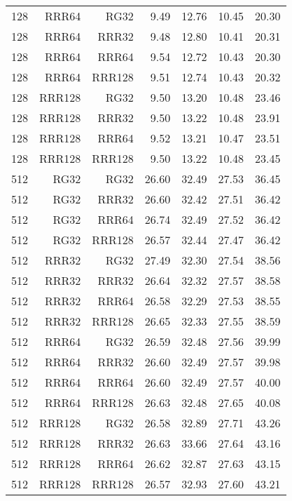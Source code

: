 \begin{table}
\begin{tabular}{|r|r|r|r|r|r|r|}
128 & RRR64 & RG32 & 9.49 & 12.76 & 10.45 & 20.30 \\
128 & RRR64 & RRR32 & 9.48 & 12.80 & 10.41 & 20.31 \\
128 & RRR64 & RRR64 & 9.54 & 12.72 & 10.43 & 20.30 \\
128 & RRR64 & RRR128 & 9.51 & 12.74 & 10.43 & 20.32 \\
128 & RRR128 & RG32 & 9.50 & 13.20 & 10.48 & 23.46 \\
128 & RRR128 & RRR32 & 9.50 & 13.22 & 10.48 & 23.91 \\
128 & RRR128 & RRR64 & 9.52 & 13.21 & 10.47 & 23.51 \\
128 & RRR128 & RRR128 & 9.50 & 13.22 & 10.48 & 23.45 \\
512 & RG32 & RG32 & 26.60 & 32.49 & 27.53 & 36.45 \\
512 & RG32 & RRR32 & 26.60 & 32.42 & 27.51 & 36.42 \\
512 & RG32 & RRR64 & 26.74 & 32.49 & 27.52 & 36.42 \\
512 & RG32 & RRR128 & 26.57 & 32.44 & 27.47 & 36.42 \\
512 & RRR32 & RG32 & 27.49 & 32.30 & 27.54 & 38.56 \\
512 & RRR32 & RRR32 & 26.64 & 32.32 & 27.57 & 38.58 \\
512 & RRR32 & RRR64 & 26.58 & 32.29 & 27.53 & 38.55 \\
512 & RRR32 & RRR128 & 26.65 & 32.33 & 27.55 & 38.59 \\
512 & RRR64 & RG32 & 26.59 & 32.48 & 27.56 & 39.99 \\
512 & RRR64 & RRR32 & 26.60 & 32.49 & 27.57 & 39.98 \\
512 & RRR64 & RRR64 & 26.60 & 32.49 & 27.57 & 40.00 \\
512 & RRR64 & RRR128 & 26.63 & 32.48 & 27.65 & 40.08 \\
512 & RRR128 & RG32 & 26.58 & 32.89 & 27.71 & 43.26 \\
512 & RRR128 & RRR32 & 26.63 & 33.66 & 27.64 & 43.16 \\
512 & RRR128 & RRR64 & 26.62 & 32.87 & 27.63 & 43.15 \\
512 & RRR128 & RRR128 & 26.57 & 32.93 & 27.60 & 43.21 \\
\hline
\end{tabular}
\end{table}

